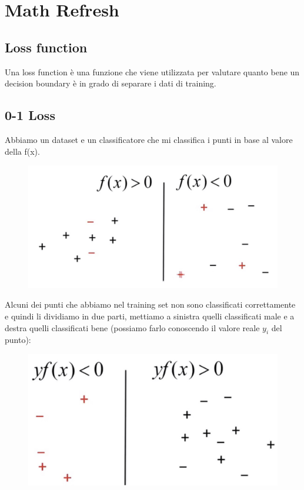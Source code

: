 \documentclass[14pt]{extreport}
\begin{document}
\chapter{Math Refresh}

\section{Loss function}

Una loss function è una funzione che viene utilizzata per valutare quanto bene un decision boundary è in grado di separare i dati di training.

\section{0-1 Loss}

Abbiamo un dataset e un classificatore che mi classifica i punti in base al valore della f(x).
\begin{figure}[H]
\centering
\includegraphics[width=0.5\linewidth]{330.jpeg}
\end{figure}

Alcuni dei punti che abbiamo nel training set non sono classificati correttamente e quindi li dividiamo in due parti, mettiamo a sinistra quelli
classificati male e a destra quelli classificati bene (possiamo farlo conoscendo il valore reale $y_i$ del punto):

\begin{figure}[H]
\centering
\includegraphics[width=0.5\linewidth]{329.jpeg}
\end{figure}
\end{document}
